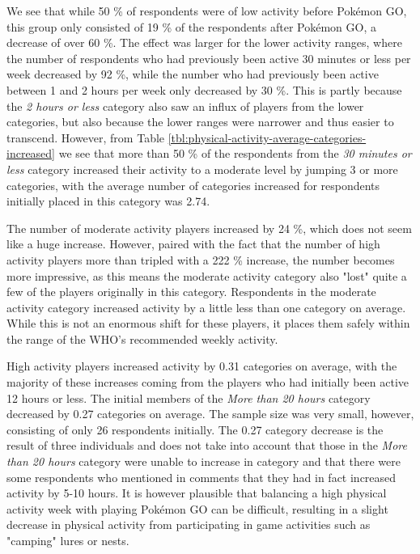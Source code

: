 We see that while 50 \% of respondents were of low activity before Pokémon GO, this group only consisted of 19 \% of the respondents after Pokémon GO, a decrease of over 60 \%. The effect was larger for the lower activity ranges, where the number of respondents who had previously been active 30 minutes or less per week decreased by 92 \%, while the number who had previously been active between 1 and 2 hours per week only decreased by 30 \%. This is partly because the \emph{2 hours or less} category also saw an influx of players from the lower categories, but also because the lower ranges were narrower and thus easier to transcend. However, from Table \ref{tbl:physical-activity-average-categories-increased} we see that more than 50 \% of the respondents from the \emph{30 minutes or less} category increased their activity to a moderate level by jumping 3 or more categories, with the average number of categories increased for respondents initially placed in this category was 2.74.

The number of moderate activity players increased by 24 \%, which does not seem like a huge increase. However, paired with the fact that the number of high activity players more than tripled with a 222 \% increase, the number becomes more impressive, as this means the moderate activity category also "lost" quite a few of the players originally in this category. Respondents in the moderate activity category increased activity by a little less than one category on average. While this is not an enormous shift for these players, it places them safely within the range of the WHO's recommended weekly activity.

High activity players increased activity by 0.31 categories on average, with the majority of these increases coming from the players who had initially been active 12 hours or less. The initial members of the \emph{More than 20 hours} category decreased by 0.27 categories on average. The sample size was very small, however, consisting of only 26 respondents initially. The 0.27 category decrease is the result of three individuals and does not take into account that those in the \emph{More than 20 hours} category were unable to increase in category and that there were some respondents who mentioned in comments that they had in fact increased activity by 5-10 hours. It is however plausible that balancing a high physical activity week with playing Pokémon GO can be difficult, resulting in a slight decrease in physical activity from participating in game activities such as "camping" lures or nests. 

